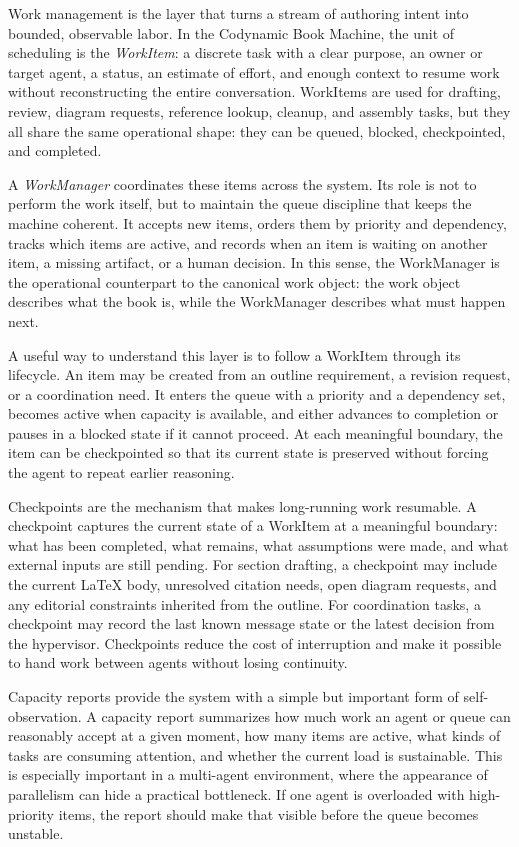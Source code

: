 Work management is the layer that turns a stream of authoring intent into bounded, observable labor. In the Codynamic Book Machine, the unit of scheduling is the \emph{WorkItem}: a discrete task with a clear purpose, an owner or target agent, a status, an estimate of effort, and enough context to resume work without reconstructing the entire conversation. WorkItems are used for drafting, review, diagram requests, reference lookup, cleanup, and assembly tasks, but they all share the same operational shape: they can be queued, blocked, checkpointed, and completed.

A \emph{WorkManager} coordinates these items across the system. Its role is not to perform the work itself, but to maintain the queue discipline that keeps the machine coherent. It accepts new items, orders them by priority and dependency, tracks which items are active, and records when an item is waiting on another item, a missing artifact, or a human decision. In this sense, the WorkManager is the operational counterpart to the canonical work object: the work object describes what the book is, while the WorkManager describes what must happen next.

A useful way to understand this layer is to follow a WorkItem through its lifecycle. An item may be created from an outline requirement, a revision request, or a coordination need. It enters the queue with a priority and a dependency set, becomes active when capacity is available, and either advances to completion or pauses in a blocked state if it cannot proceed. At each meaningful boundary, the item can be checkpointed so that its current state is preserved without forcing the agent to repeat earlier reasoning.

Checkpoints are the mechanism that makes long-running work resumable. A checkpoint captures the current state of a WorkItem at a meaningful boundary: what has been completed, what remains, what assumptions were made, and what external inputs are still pending. For section drafting, a checkpoint may include the current \LaTeX{} body, unresolved citation needs, open diagram requests, and any editorial constraints inherited from the outline. For coordination tasks, a checkpoint may record the last known message state or the latest decision from the hypervisor. Checkpoints reduce the cost of interruption and make it possible to hand work between agents without losing continuity.

Capacity reports provide the system with a simple but important form of self-observation. A capacity report summarizes how much work an agent or queue can reasonably accept at a given moment, how many items are active, what kinds of tasks are consuming attention, and whether the current load is sustainable. This is especially important in a multi-agent environment, where the appearance of parallelism can hide a practical bottleneck. If one agent is overloaded with high-priority items, the report should make that visible before the queue becomes unstable.


